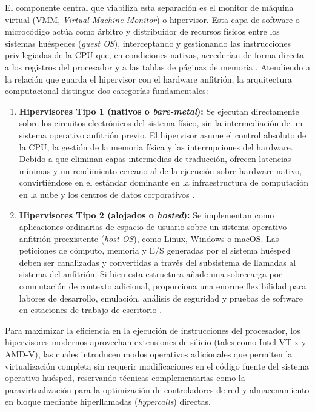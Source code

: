 \documentclass[12pt]{article}
\begin{document}
El componente central que viabiliza esta separación es el monitor de máquina virtual (VMM, \textit{Virtual Machine Monitor}) o hipervisor. Esta capa de software o microcódigo actúa como árbitro y distribuidor de recursos físicos entre los sistemas huéspedes (\textit{guest OS}), interceptando y gestionando las instrucciones privilegiadas de la CPU que, en condiciones nativas, accederían de forma directa a los registros del procesador y a las tablas de páginas de memoria \parencite[\S 14.2, p.\ 631]{stallings2018operating}. Atendiendo a la relación que guarda el hipervisor con el hardware anfitrión, la arquitectura computacional distingue dos categorías fundamentales:

\begin{enumerate}[leftmargin=*]
    \item \textbf{Hipervisores Tipo 1 (nativos o \textit{bare-metal}):} Se ejecutan directamente sobre los circuitos electrónicos del sistema físico, sin la intermediación de un sistema operativo anfitrión previo. El hipervisor asume el control absoluto de la CPU, la gestión de la memoria física y las interrupciones del hardware. Debido a que eliminan capas intermedias de traducción, ofrecen latencias mínimas y un rendimiento cercano al de la ejecución sobre hardware nativo, convirtiéndose en el estándar dominante en la infraestructura de computación en la nube y los centros de datos corporativos \parencite[\S 14.2, p.\ 632]{stallings2018operating}.
    
    \item \textbf{Hipervisores Tipo 2 (alojados o \textit{hosted}):} Se implementan como aplicaciones ordinarias de espacio de usuario sobre un sistema operativo anfitrión preexistente (\textit{host OS}), como Linux, Windows o macOS. Las peticiones de cómputo, memoria y E/S generadas por el sistema huésped deben ser canalizadas y convertidas a través del subsistema de llamadas al sistema del anfitrión. Si bien esta estructura añade una sobrecarga por conmutación de contexto adicional, proporciona una enorme flexibilidad para labores de desarrollo, emulación, análisis de seguridad y pruebas de software en estaciones de trabajo de escritorio \parencite[\S 14.2, p.\ 633]{stallings2018operating}.
\end{enumerate}

Para maximizar la eficiencia en la ejecución de instrucciones del procesador, los hipervisores modernos aprovechan extensiones de silicio (tales como Intel VT-x y AMD-V), las cuales introducen modos operativos adicionales que permiten la virtualización completa sin requerir modificaciones en el código fuente del sistema operativo huésped, reservando técnicas complementarias como la paravirtualización para la optimización de controladores de red y almacenamiento en bloque mediante hiperllamadas (\textit{hypercalls}) directas.
\end{document}
